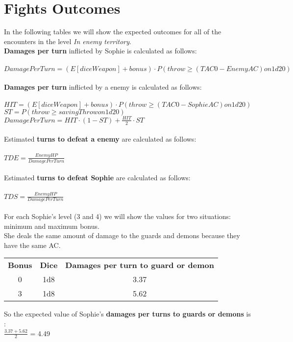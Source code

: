 \section{Fights Outcomes}
In the following tables we will show the expected outcomes for all of the encounters in the level \textit{In enemy territory}. \\
\textbf{Damages per turn} inflicted by Sophie is calculated as follows:\\\\
$DamagePerTurn=(E[diceWeapon] + bonus) \cdot P(throw \ge (TAC0 - EnemyAC) on 1d20)$\\\\
\textbf{Damages per turn} inflicted by a enemy is calculated as follows:\\\\
$HIT=(E[diceWeapon] + bonus) \cdot P(throw \ge (TAC0 - SophieAC) on 1d20)$\\
$ST=P(throw \ge savingThrow on 1d20)$\\
$DamagePerTurn=HIT \cdot (1-ST)+\frac{HIT}{2} \cdot ST$\\\\
Estimated \textbf{turns to defeat a enemy} are calculated as follows:\\\\
$TDE=\frac{EnemyHP}{DamagePerTurn}$\\\\
Estimated \textbf{turns to defeat Sophie} are calculated as follows:\\\\
$TDS=\frac{EnemyHP}{DamagePerTurn}$\\\\
For each Sophie's level (3 and 4) we will show the values for two situations: minimum and maximum bonus.\\
She deals the same amount of damage to the guards and demons because they have the same AC.
\begin{table}[H]
  \centering
  \begin{tabular}{|c|c|c|}
    \hline
    \rowcolor[HTML]{9B9B9B}
    \multicolumn{3}{|c|}{\cellcolor[HTML]{9B9B9B}{\color[HTML]{FFFFFF} \textbf{Sophie}}} \\ \hline
    \rowcolor[HTML]{C0C0C0}
    \textbf{Bonus} & \textbf{Dice} & \textbf{Damages per turn to guard or demon} \\ \hline
    0 & 1d8 & 3.37 \\ \hline
    3 & 1d8 & 5.62 \\ \hline
  \end{tabular}
\end{table}
So the expected value of Sophie's \textbf{damages per turns to guards or demons} is :\\
$\frac{3.37+5.62}{2}$ = 4.49\\

